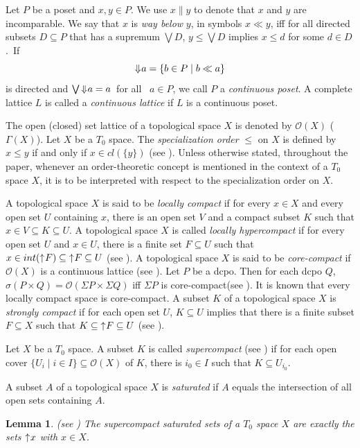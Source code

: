 \documentclass[preprint,12pt]{elsarticle}
\numberwithin{equation}{section}
\newtheorem{lemma}[theorem]{Lemma}
\newcommand{\up}{\mathord{\uparrow}\hspace{0.05em}}
\newcommand{\uuar}{\mathord{\Downarrow}\hspace{0.05em}}
\begin{document}
\quad Let $P$ be a poset and $x, y\in P$. We use $x\|y$ to denote that $x$ and $y$ are incomparable.  We say that $x$ is {\em way below} $y$, in symbols $x\ll y$, iff for all directed subsets $D\subseteq P$ that has a supremum $\bigvee D$, $y\leq\bigvee D$ implies $x\leq d$ for some $d\in D$.\ If  $$\uuar a=\{b\in P\mid b\ll a\}$$ is  directed  and $\bigvee \uuar a=a$\ for all \ $a\in P$, we call $P$  a {\em continuous poset}. A complete lattice $L$ is called a {\em continuous lattice} if $L$ is a continuous poset.


\quad  The open (closed) set lattice of a topological space $X$ is denoted by $\mathcal{O}(X)$ ($\Gamma(X)$). Let $X$ be a $T_{0}$ space. The {\em specialization order} $\leq$ on $X$ is defined by $x\leq y$ if and only if $x\in cl(\{y\})$ (see \cite{GG03}). Unless otherwise stated, throughout the paper, whenever an order-theoretic concept is mentioned in the context of a $T_{0}$ space $X$, it is to be interpreted with respect to the specialization order on $X$.




\quad A topological space $X$ is said to be {\em locally compact} if for every $x\in X$ and every open set $U$ containing $x$, there is an open set $V$ and a compact subset $K$ such that $x\in V\subseteq K\subseteq U$. A topological space $X$ is called {\em locally hypercompact} if for every open set $U$ and $x\in U$, there is a finite set $F\subseteq U$ such that $x\in int(\up F)\subseteq \up F\subseteq U$ (see \cite{KDFGY35}). A topological space $X$ is said to be  {\em core-compact } if  $\mathcal{O}(X)$ is a continuous lattice (see \cite{JGKD13}). Let $P$ be a dcpo. Then for each dcpo $Q$, $\sigma(P\times Q)=\mathcal{O}(\Sigma P\times\Sigma Q)$ iff $\Sigma P$ is core-compact(see \cite{GG03}). It is known that every locally compact space is core-compact. A subset $K$ of a topological space $X$ is {\em strongly compact} if for each open set $U$, $K\subseteq U$ implies that there is a finite subset $F\subseteq X$ such that $K\subseteq\up F\subseteq U$ (see \cite{WM34}).


\quad Let $X$ be a $T_{0}$ space. A subset $K$ is called  {\em supercompact} (see \cite{MU13})  if for each open cover $\{U_{i}\mid i\in I\}\subseteq\mathcal{O}(X)$ of $K$, there is  $i_0\in I$ such that $K \subseteq U_{i_0}$.

\quad A subset $A$ of a  topological space $X$ is {\em saturated} if $A$ equals the intersection of all open sets containing $A$.

\begin{lemma}(see \cite{MU13}) The supercompact saturated sets of a $T_{0}$ space $X$ are exactly the
sets $\up x$ with $x\in X$.
\end{lemma}
\end{document}
